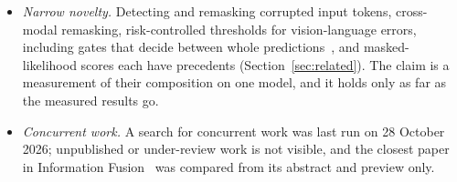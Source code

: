 \begin{itemize}
list and the missing-item rule applies; a fold under 240 items is reported as incomplete.
\item \emph{Narrow novelty.} Detecting and remasking corrupted input tokens, cross-modal remasking, risk-controlled thresholds for
vision-language errors, including gates that decide between whole predictions~\citep{zhou2027burden}, and masked-likelihood scores
each have precedents (Section~\ref{sec:related}). The claim is a measurement of their composition on one model, and it holds only as
far as the measured results go.
\item \emph{Concurrent work.} A search for concurrent work was last run on 28 October 2026; unpublished or under-review work is not
visible, and the closest paper in Information Fusion~\citep{zhou2027burden} was compared from its abstract and preview only.
\end{itemize}
